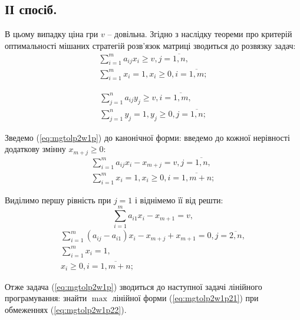 \documentclass[12pt,a4paper]{book}
\begin{document}
\subsection{ІІ спосіб.}

В цьому випадку ціна гри $v$ – довільна. Згідно з наслідку теореми про критерій оптимальності мішаних стратегій розв’язок матриці зводиться до розвязку задач:
\begin{equation}
\begin{array}{l}
\displaystyle \sum_{i=1}^m a_{ij} x_i \geq v,  j=\overline{1,n},\\
\displaystyle \sum_{i=1}^m x_i = 1, x_i \geq 0, i=\overline{1,m};
\end{array}
\label{eq:mgtolp2w1p}
\end{equation}

\begin{equation}
\begin{array}{l}
\displaystyle \sum_{j=1}^n a_{ij} y_j \geq v,  i=\overline{1,m},\\
\displaystyle \sum_{j=1}^n y_j = 1, y_j \geq 0, j=\overline{1,n};
\end{array}
\label{eq:mgtolp2w2p}
\end{equation}

Зведемо (\ref{eq:mgtolp2w1p}) до канонічної форми: введемо до кожної нерівності додаткову змінну $x_{m+j} \geq 0$:
\[ \begin{array}{l}
\displaystyle \sum_{i=1}^m a_{ij} x_i  - x_{m+j} = v,  j=\overline{1,n},\\
\displaystyle \sum_{i=1}^m x_i = 1, x_i \geq 0, i=\overline{1,m+n};
\end{array} \]

Виділимо першу рівність при $j=1$ і віднімемо її від решти:
\begin{equation} \sum_{i=1}^m a_{i 1} x_i  - x_{m+1} = v, \label{eq:mgtolp2w1p21} \end{equation}
\begin{equation}
\begin{array}{l}
\displaystyle \sum_{i=1}^m (a_{ij} - a_{i 1}) x_i  - x_{m+j} + x_{m+1} = 0,  j=\overline{2,n},\\
\displaystyle \sum_{i=1}^m x_i = 1,\\
x_i \geq 0, i=\overline{1,m+n};
\end{array}
\label{eq:mgtolp2w1p22}
\end{equation}

Отже задача (\ref{eq:mgtolp2w1p}) зводиться до наступної задачі лінійного програмування: знайти $\max$ лінійної форми (\ref{eq:mgtolp2w1p21}) при обмеженнях (\ref{eq:mgtolp2w1p22}).
\end{document}
